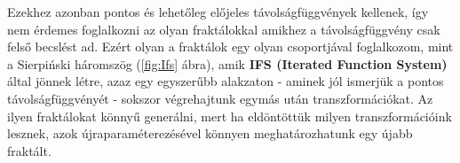 Ezekhez azonban pontos és lehetőleg előjeles távolságfüggvények kellenek, így nem érdemes foglalkozni az olyan fraktálokkal amikhez a távolságfüggvény csak felső becslést ad. Ezért olyan a fraktálok egy olyan csoportjával foglalkozom, mint a Sierpiński háromszög (\ref{fig:Ifs} ábra), amik \textbf{IFS (Iterated Function System)}  által jönnek létre, azaz egy egyszerűbb alakzaton - aminek jól ismerjük a pontos távolságfüggvényét - sokszor végrehajtunk egymás után transzformációkat. Az ilyen fraktálokat könnyű generálni, mert ha eldöntöttük milyen transzformációink lesznek, azok újraparaméterezésével könnyen meghatározhatunk egy újabb fraktált.
